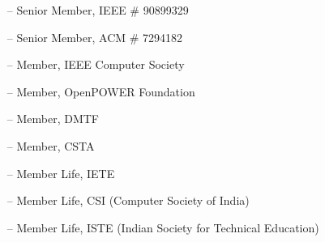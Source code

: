 \begin{itemize}
	\item[--] Senior Member, IEEE  \# 90899329
	\item[--]
	Senior Member, ACM  \#  7294182
	\item[--]
	Member, IEEE Computer Society 
	\item[--]
	Member, OpenPOWER Foundation 
	\item[--]
	Member, DMTF  
	\item[--]
	Member, CSTA
	\item[--]
	Member Life, IETE
	\item[--]
	Member Life, CSI (Computer Society of India) 
	\item[--]
	Member Life, ISTE (Indian Society for Technical Education) 
\end{itemize}
